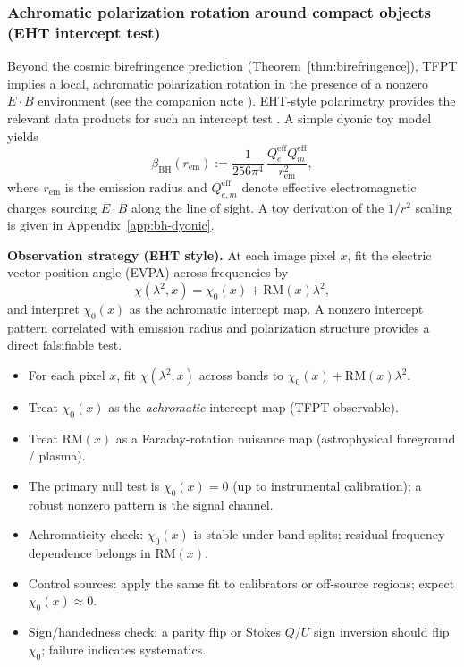 \subsubsection{Achromatic polarization rotation around compact objects (EHT intercept test)}
\label{sec:eht-intercept}

Beyond the cosmic birefringence prediction (Theorem~\ref{thm:birefringence}), TFPT implies a local, achromatic polarization rotation
in the presence of a nonzero $E\cdot B$ environment (see the companion note \cite{bhAchromaticRotationNote2025}). EHT-style polarimetry
provides the relevant data products for such an intercept test \cite{ehtm87pol2021}. A simple dyonic toy model yields
\begin{equation}
\beta_{\mathrm{BH}}(r_{\mathrm{em}})
:= \frac{1}{256\pi^4}\,\frac{Q^{\mathrm{eff}}_e Q^{\mathrm{eff}}_m}{r_{\mathrm{em}}^2},
\end{equation}
where $r_{\mathrm{em}}$ is the emission radius and $Q^{\mathrm{eff}}_{e,m}$ denote effective electromagnetic charges sourcing $E\cdot B$ along the line of sight. A toy derivation of the $1/r^2$ scaling is given in Appendix~\ref{app:bh-dyonic}.

\textbf{Observation strategy (EHT style).}
At each image pixel $x$, fit the electric vector position angle (EVPA) across frequencies by
\begin{equation}
\chi(\lambda^2,x)=\chi_0(x)+\mathrm{RM}(x)\lambda^2,
\end{equation}
and interpret $\chi_0(x)$ as the achromatic intercept map. A nonzero intercept pattern correlated
with emission radius and polarization structure provides a direct falsifiable test.

\begin{tcolorbox}[colback=gray!5, colframe=gray!60, breakable,
title={\textbf{EHT Intercept Map Procedure (achromatic intercept $\chi_0$)}}, fonttitle=\bfseries\small]
\begin{itemize}[leftmargin=1.5em, topsep=2pt, itemsep=2pt]
    \item For each pixel $x$, fit $\chi(\lambda^2,x)$ across bands to $\chi_0(x)+\mathrm{RM}(x)\lambda^2$.
    \item Treat $\chi_0(x)$ as the \emph{achromatic} intercept map (TFPT observable).
    \item Treat $\mathrm{RM}(x)$ as a Faraday-rotation nuisance map (astrophysical foreground / plasma).
    \item The primary null test is $\chi_0(x)=0$ (up to instrumental calibration); a robust nonzero pattern is the signal channel.
    \item Achromaticity check: $\chi_0(x)$ is stable under band splits; residual frequency dependence belongs in $\mathrm{RM}(x)$.
    \item Control sources: apply the same fit to calibrators or off-source regions; expect $\chi_0(x)\approx 0$.
    \item Sign/handedness check: a parity flip or Stokes $Q/U$ sign inversion should flip $\chi_0$; failure indicates systematics.
\end{itemize}
\end{tcolorbox}

